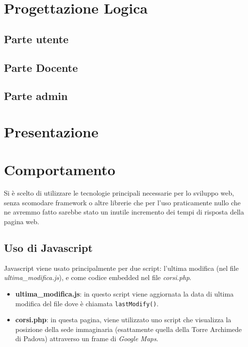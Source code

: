 \documentclass[12pt, a4paper]{article}
\begin{document}
\section{Progettazione Logica}
\subsection{Parte utente}
\subsection{Parte Docente}
\subsection{Parte admin}

\section{Presentazione}

\section{Comportamento}
Si è scelto di utilizzare le tecnologie principali necessarie per lo sviluppo web, senza
scomodare framework o altre librerie che per l'uso praticamente nullo che ne avremmo fatto
sarebbe stato un inutile incremento dei tempi di risposta della pagina web.

\subsection{Uso di Javascript}
Javascript viene usato principalmente per due script: l'ultima modifica (nel file \textit{ultima\_modifica.js}), e come codice embedded nel file \textit{corsi.php}.
\begin{itemize}
	\item \textbf{ultima\_modifica.js}: in questo script viene aggiornata la data di ultima modifica del file dove è chiamata \texttt{lastModify()}.
	\item \textbf{corsi.php}: in questa pagina, viene utilizzato uno script che visualizza la posizione della sede immaginaria (esattamente quella della 
	Torre Archimede di Padova) attraverso un frame di \textit{Google Maps}.
\end{itemize}
\end{document}
